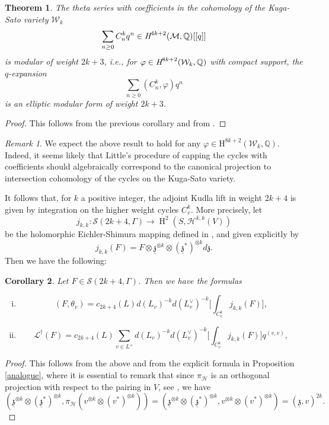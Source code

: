 \documentclass[12pt,a4paper,reqno]{amsart}
\theoremstyle{definition}
\numberwithin{definition}{subsection}
\theoremstyle{definition}
\numberwithin{Definition}{subsection}
\theoremstyle{remark}
\theoremstyle{remark}
\newtheorem{Remark}{Remark}
\numberwithin{Remark}{subsection}
\theoremstyle{remark}
\theoremstyle{plain}
\newtheorem{Theorem}{Theorem}
\numberwithin{Theorem}{subsection}
\theoremstyle{plain}
\theoremstyle{plain}
\theoremstyle{plain}
\newtheorem{Corollary}[Theorem]{Corollary}
\theoremstyle{plain}
\theoremstyle{plain}
\theoremstyle{plain}
\theoremstyle{plain}
\newcommand*{\Q}{\mathbb{Q}}
\DeclareMathOperator{\h}{H}
\begin{document}
\begin{Theorem}
\label{main2}
The theta series with coefficients in the cohomology of the Kuga-Sato variety $\mathcal{W}_k$
\[
\sum_{n\geq 0}C_n^k q^n\in \emph{H}^{4k+2}(\mathcal{M},\Q)[[q]]
\]
is modular of weight $2k+3$, i.e., for $\varphi\in \emph{H}^{8k+2}(\mathcal{W}_k,\Q)$ with compact support, the $q$-expansion
\[
\sum_{n\geq 0}(C_n^k, \varphi) q^n
\]
is an elliptic modular form of weight $2k+3$.
\end{Theorem}

\begin{proof}
This follows from the previous corollary and from \cite[Theorem $6.4.1$]{little}.
\end{proof}

\begin{Remark}
We expect the above result to hold for any $\varphi\in \text{H}^{8k+2}(\mathcal{W}_k,\Q)$. Indeed, it seems likely that Little's procedure of capping the cycles with coefficients should algebraically correspond to the canonical projection to intersection cohomology of the cycles on the Kuga-Sato variety.   
\end{Remark}
\noindent It follows that, for $k$ a positive integer, the adjoint Kudla lift in weight $2k+4$ is given by integration on the higher weight cycles $C_v^k$. More precisely, let $$j_{k,k}:\mathscr{S}(2k+4,\Gamma)\to \h^2(S,\mathcal{H}^{k,k}(V))$$ be the holomorphic Eichler-Shimura mapping defined in \cite[p. 246]{hidashimura}, and given explicitly by 
\[
j_{k,k}(F)=F\otimes \underline{\mathfrak{z}}^{\otimes k}\otimes (\underline{\mathfrak{z}}^*)^{\otimes k}d\mathfrak{z}.
\] 
Then we have the following:
\begin{Corollary}
\label{relation}
Let $F\in \mathscr{S}(2k+4,\Gamma)$. Then we have the formulas
\begin{enumerate}[(i)]
\item $$(F,\theta_v)=c_{2k+4}(L)d(L_v)^{-k}d(L_v^\vee)^{-k}\Big[\int_{C_v^k}j_{k,k}(F)\Big],$$
\item 
\[
\mathcal{L}^\dagger(F)=c_{2k+4}(L)\sum_{v\in L^+}d(L_v)^{-k}d(L_v^\vee)^{-k}\Big[\int_{C_v^k}j_{k,k}(F)\Big]q^{(v,v)},
\]
\end{enumerate}

\end{Corollary}
\begin{proof}
This follows from the above and from the explicit formula in Proposition \ref{analogue}, where it is essential to remark that since $\pi_{\mathcal{H}}$ is an orthogonal projection with respect to the pairing in $V$, see \cite[p. 26]{gordon}, we have
\[
(\underline{\mathfrak{z}}^{\otimes k}\otimes (\underline{\mathfrak{z}}^*)^{\otimes k},\pi_{\mathcal{H}}(v^{\otimes k}\otimes (v^*)^{\otimes k}))=(\underline{\mathfrak{z}}^{\otimes k}\otimes (\underline{\mathfrak{z}}^*)^{\otimes k},v^{\otimes k}\otimes (v^*)^{\otimes k})=(\underline{\mathfrak{z}},v)^{2k}.
\]
\end{proof}
\end{document}
